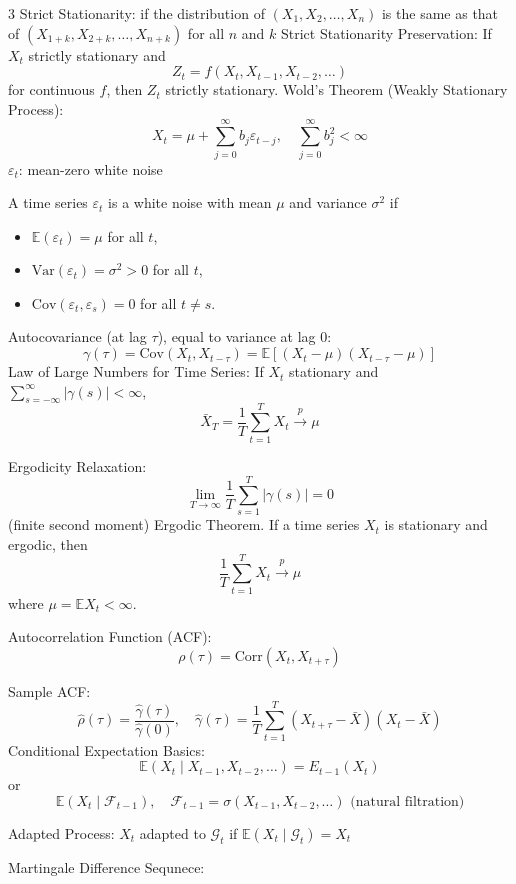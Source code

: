 \documentclass[10pt,a4paper]{article}
\begin{document}
\begin{multicols}{3}
Strict Stationarity: if the distribution of $(X_1, X_2, \dots, X_n)$ is the same as that of $(X_{1+k}, X_{2+k}, \dots, X_{n+k})$ for all $n$ and $k$
Strict Stationarity Preservation:
If $X_t$ strictly stationary and
\[
Z_t = f(X_t, X_{t-1}, X_{t-2}, \dots)
\]
for continuous $f$, then $Z_t$ strictly stationary.
Wold's Theorem (Weakly Stationary Process):
\[
X_t = \mu + \sum_{j=0}^{\infty} b_j \varepsilon_{t-j}, \quad \sum_{j=0}^{\infty} b_j^2 < \infty
\]
$\varepsilon_t$: mean-zero white noise

A time series $\varepsilon_t$ is a white noise with mean $\mu$ and variance $\sigma^2$ if
\begin{itemize}
    \item $\mathbb{E}(\varepsilon_t) = \mu$ \quad for all $t$,
    \item $\mathrm{Var}(\varepsilon_t) = \sigma^2 > 0$ \quad for all $t$,
    \item $\mathrm{Cov}(\varepsilon_t, \varepsilon_s) = 0$ \quad for all $t \neq s$.
\end{itemize}

Autocovariance (at lag $\tau$), equal to variance at lag 0:
\[
\gamma(\tau) = \mathrm{Cov}(X_t, X_{t-\tau}) = \mathbb{E}\left[(X_t - \mu)(X_{t-\tau} - \mu)\right]
\]
Law of Large Numbers for Time Series:
If $X_t$ stationary and $\sum_{s=-\infty}^{\infty} |\gamma(s)| < \infty$,
\[
\bar{X}_T = \frac{1}{T} \sum_{t=1}^T X_t \xrightarrow{p} \mu
\]

Ergodicity Relaxation:
\[
\lim_{T \to \infty} \frac{1}{T} \sum_{s=1}^T |\gamma(s)| = 0
\]
(finite second moment)
Ergodic Theorem. If a time series $X_t$ is stationary and ergodic, then
\[
\frac{1}{T} \sum_{t=1}^{T} X_t \xrightarrow{p} \mu
\]
where $\mu = \mathbb{E}X_t < \infty$.

Autocorrelation Function (ACF):
\[
\rho(\tau) = \mathrm{Corr}(X_t, X_{t+\tau})
\]

Sample ACF:
\[
\hat{\rho}(\tau) = \frac{\hat{\gamma}(\tau)}{\hat{\gamma}(0)}, \quad \hat{\gamma}(\tau) = \frac{1}{T} \sum_{t=1}^{T} (X_{t+\tau} - \bar{X})(X_t - \bar{X})
\]
Conditional Expectation Basics:
\[
\mathbb{E}(X_t \mid X_{t-1}, X_{t-2}, \dots) = E_{t-1}(X_t)
\]
or
\[
\mathbb{E}(X_t \mid \mathcal{F}_{t-1}), \quad \mathcal{F}_{t-1} = \sigma(X_{t-1}, X_{t-2}, \dots) \text{ (natural filtration)}
\]

Adapted Process:
$X_t$ adapted to $\mathcal{G}_t$ if $\mathbb{E}(X_t \mid \mathcal{G}_t) = X_t$

Martingale Difference Sequnece:


\end{multicols}
\end{document}
